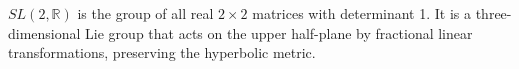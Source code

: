 $SL(2, \mathbb{R})$ is the group of all real $2 \times 2$ matrices with determinant 1. It is a three-dimensional Lie group that acts on the upper half-plane by fractional linear transformations, preserving the hyperbolic metric.